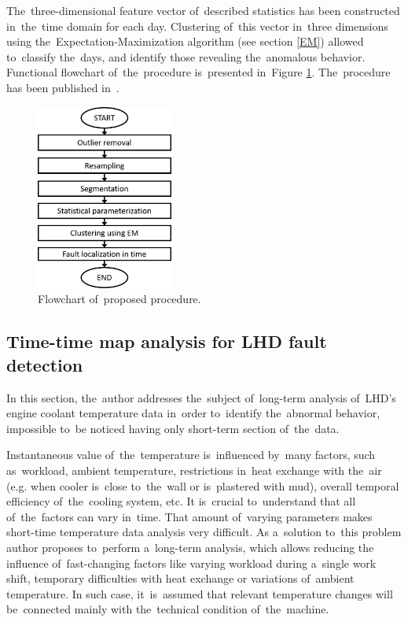 The~three-dimensional feature vector of~described statistics has been constructed in~the~time domain for each day. Clustering of~this vector in~three dimensions using the~Expectation-Maximization algorithm (see section \ref{EM}) allowed to~classify the~days, and identify those revealing the~anomalous behavior. Functional flowchart of~the~procedure is~presented in~Figure \ref{fig: sch_em}. The~procedure has been published in~\cite{wodecki2018unsupervised}.

\begin{figure}[ht!]
\centering
\includegraphics[width = 0.4\textwidth]{wykresy/sch_em.png}
\caption{Flowchart of~proposed procedure.}
\label{fig: sch_em}
\end{figure}


\subsection{Time-time map analysis for LHD fault detection}\label{temp_bulgaria}

In this section, the~author addresses the~subject of~long-term analysis of~LHD's engine coolant temperature data in~order to~identify the~abnormal behavior, impossible to~be noticed having only short-term section of~the~data. 

Instantaneous value of~the~temperature is~influenced by~many factors, such as~workload, ambient temperature, restrictions in~heat exchange with the~air (e.g. when cooler is~close to~the~wall or is~plastered with mud), overall temporal efficiency of~the~cooling system, etc. It is~crucial to~understand that all of~the~factors can vary in~time. That amount of~varying parameters makes short-time temperature data analysis very difficult. As a~solution to~this problem author proposes to~perform a~long-term analysis, which allows reducing the influence of~fast-changing factors like varying workload during a~single work shift, temporary difficulties with heat exchange or variations of~ambient temperature. In such case, it~is~assumed that relevant temperature changes will be~connected mainly with the~technical condition of~the~machine.


